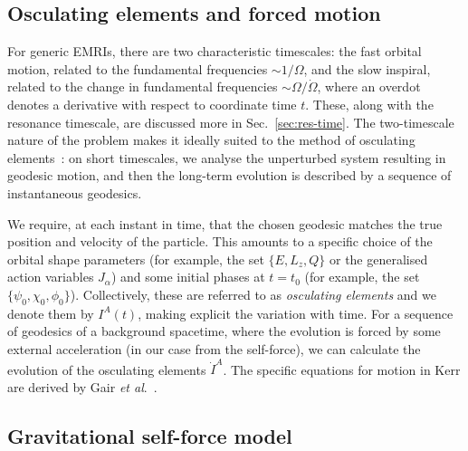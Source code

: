 \documentclass[aps,prd,amsfonts,amssymb,amsmath,nofootinbib,showpacs,superscriptaddress,twocolumn,floatfix]{revtex4-1}
\newcommand{\secref}[1]{Sec.~\ref{sec:#1}}
\newcommand{\dd}{\ensuremath{\mathrm{d}}}
\newcommand{\diff}[2]{\ensuremath{\dfrac{\dd {#1}}{\dd {#2}}}}
\newcommand{\difftwo}[2]{\ensuremath{\dfrac{\dd^2 {#1}}{\dd {#2}^2}}}
\begin{document}
\subsection{Osculating elements and forced motion}
\label{sec:forced-motion}

For generic EMRIs, there are two characteristic timescales: the fast orbital motion, related to the fundamental frequencies $\sim1/\Omega$, and the slow inspiral, related to the change in fundamental frequencies $\sim\Omega/\dot{\Omega}$, where an overdot denotes a derivative with respect to coordinate time $t$. These, along with the resonance timescale, are discussed more in \secref{res-time}. The two-timescale nature of the problem makes it ideally suited to the method of osculating elements~\cite{Pound2008,Gair2011a}: on short timescales, we analyse the unperturbed system resulting in geodesic motion, and then the long-term evolution is described by a sequence of instantaneous geodesics.

We require, at each instant in time, that the chosen geodesic matches the true position and velocity of the particle. This amounts to a specific choice of the orbital shape parameters (for example, the set $\{E,L_z,Q\}$ or the generalised action variables $J_\alpha$) and some initial phases at $t=t_0$ (for example, the set $\{\psi_0,\chi_0,\phi_0\}$). Collectively, these are referred to as \emph{osculating elements} and we denote them by $I^A(t)$, making explicit the variation with time. For a sequence of geodesics of a background spacetime, where the evolution is forced by some external acceleration (in our case from the self-force), we can calculate the evolution of the osculating elements $\dot{I}^A$. The specific equations for motion in Kerr are derived by Gair {\it{et al}}.~\cite{Gair2011a}. 


\subsection{Gravitational self-force model}
\label{sec:self-force}
\end{document}
